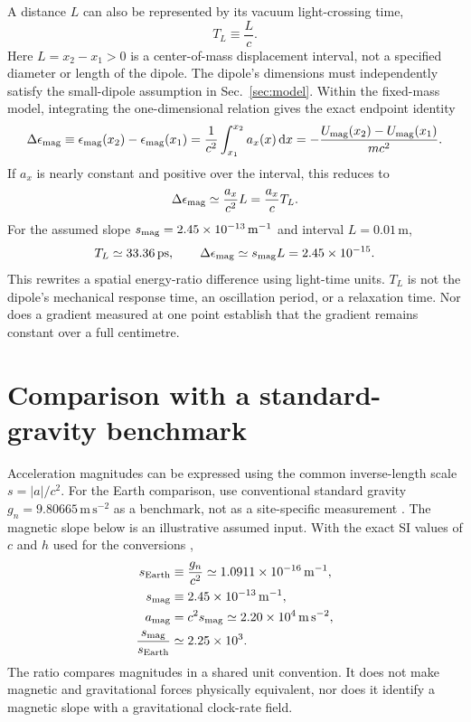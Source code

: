 \documentclass[12pt]{article}
\begin{document}
A distance $L$ can also be represented by its vacuum light-crossing time,
\begin{equation}
  T_L\equiv\frac{L}{c}.
  \label{eq:light-time}
\end{equation}
Here $L=x_2-x_1>0$ is a center-of-mass displacement interval, not a specified diameter or length of the dipole. The dipole's dimensions must independently satisfy the small-dipole assumption in Sec.~\ref{sec:model}. Within the fixed-mass model, integrating the one-dimensional relation gives the exact endpoint identity
\begin{equation}
  \Delta\epsilon_{\rm mag}
  \equiv\epsilon_{\rm mag}(x_2)-\epsilon_{\rm mag}(x_1)
  =\frac{1}{c^2}\int_{x_1}^{x_2}a_x(x)\,\mathrm dx
  =-\frac{U_{\rm mag}(x_2)-U_{\rm mag}(x_1)}{mc^2}.
  \label{eq:epsilon-integral}
\end{equation}
If $a_x$ is nearly constant and positive over the interval, this reduces to
\begin{equation}
  \Delta\epsilon_{\rm mag}
  \simeq\frac{a_x}{c^2}L
  =\frac{a_x}{c}T_L.
  \label{eq:epsilon-distance}
\end{equation}
For the assumed slope $s_{\rm mag}=2.45\times10^{-13}\,\mathrm{m^{-1}}$ and interval $L=0.01\,\mathrm m$,
\begin{equation}
  T_L\simeq33.36\,\mathrm{ps},
  \qquad
  \Delta\epsilon_{\rm mag}\simeq s_{\rm mag}L
     =2.45\times10^{-15}.
  \label{eq:one-centimetre-example}
\end{equation}
This rewrites a spatial energy-ratio difference using light-time units. $T_L$ is not the dipole's mechanical response time, an oscillation period, or a relaxation time. Nor does a gradient measured at one point establish that the gradient remains constant over a full centimetre.

\section{Comparison with a standard-gravity benchmark}
\label{sec:comparison}

Acceleration magnitudes can be expressed using the common inverse-length scale $s=|a|/c^2$. For the Earth comparison, use conventional standard gravity $g_n=9.80665\,\mathrm{m\,s^{-2}}$ as a benchmark, not as a site-specific measurement \cite{JCGM}. The magnetic slope below is an illustrative assumed input. With the exact SI values of $c$ and $h$ used for the conversions \cite{BIPM},
\begin{align}
  s_{\rm Earth}&\equiv\frac{g_n}{c^2}
     \simeq1.0911\times10^{-16}\,\mathrm{m^{-1}},\\
  s_{\rm mag}&\equiv2.45\times10^{-13}\,\mathrm{m^{-1}},\\
  a_{\rm mag}&=c^2s_{\rm mag}
     \simeq2.20\times10^4\,\mathrm{m\,s^{-2}},\\
  \frac{s_{\rm mag}}{s_{\rm Earth}}&\simeq2.25\times10^3.
  \label{eq:slope-comparison-values}
\end{align}
The ratio compares magnitudes in a shared unit convention. It does not make magnetic and gravitational forces physically equivalent, nor does it identify a magnetic slope with a gravitational clock-rate field.
\end{document}
